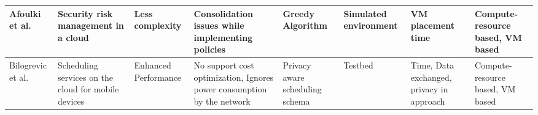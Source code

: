 \begin{table*}[!htbp]
{\begin{tabular}{|p{1.9cm} p{2cm} p{2cm} p{2cm} p{2cm} p{2cm} p{2cm} p{2cm}|}
Afoulki et al.~\cite{afoulki2011security}& Security risk management in a cloud &  Less complexity & Consolidation issues while implementing policies & Greedy Algorithm & Simulated environment & VM placement time & Compute-resource based, VM based
\\ \hline 

Bilogrevic et al.~\cite{bilogrevic2011meetings} & Scheduling services on the cloud for mobile devices & Enhanced Performance & No support cost optimization, Ignores power consumption by the network & Privacy aware scheduling schema & Testbed & Time, Data exchanged, privacy in approach & Compute-resource based, VM based
 \\ \hline
\end{tabular}
}

\end{table*}